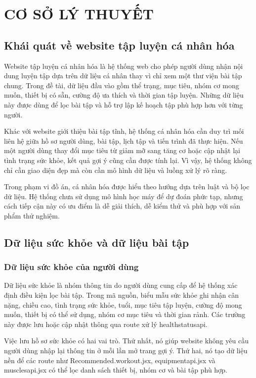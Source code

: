 \chapter{CƠ SỞ LÝ THUYẾT}

\section{Khái quát về website tập luyện cá nhân hóa}

Website tập luyện cá nhân hóa là hệ thống web cho phép người dùng nhận nội dung luyện tập dựa trên dữ liệu cá nhân thay vì chỉ xem một thư viện bài tập chung. Trong đề tài, dữ liệu đầu vào gồm thể trạng, mục tiêu, nhóm cơ mong muốn, thiết bị có sẵn, cường độ ưa thích và thời gian tập luyện. Những dữ liệu này được dùng để lọc bài tập và hỗ trợ lập kế hoạch tập phù hợp hơn với từng người.


Khác với website giới thiệu bài tập tĩnh, hệ thống cá nhân hóa cần duy trì mối liên hệ giữa hồ sơ người dùng, bài tập, lịch tập và tiến trình đã thực hiện. Nếu một người dùng thay đổi mục tiêu từ giảm mỡ sang tăng cơ hoặc cập nhật lại tình trạng sức khỏe, kết quả gợi ý cũng cần được tính lại. Vì vậy, hệ thống không chỉ cần giao diện đẹp mà còn cần mô hình dữ liệu và luồng xử lý rõ ràng.


Trong phạm vi đồ án, cá nhân hóa được hiểu theo hướng dựa trên luật và bộ lọc dữ liệu. Hệ thống chưa sử dụng mô hình học máy để dự đoán phức tạp, nhưng cách tiếp cận này có ưu điểm là dễ giải thích, dễ kiểm thử và phù hợp với sản phẩm thử nghiệm.


\section{Dữ liệu sức khỏe và dữ liệu bài tập}

\subsection{Dữ liệu sức khỏe của người dùng}

Dữ liệu sức khỏe là nhóm thông tin do người dùng cung cấp để hệ thống xác định điều kiện lọc bài tập. Trong mã nguồn, biểu mẫu sức khỏe ghi nhận cân nặng, chiều cao, tình trạng sức khỏe, tuổi, mục tiêu tập luyện, cường độ mong muốn, thiết bị có thể sử dụng, nhóm cơ mục tiêu và thời gian rảnh. Các trường này được lưu hoặc cập nhật thông qua route xử lý healthstatusapi.


Việc lưu hồ sơ sức khỏe có hai vai trò. Thứ nhất, nó giúp website không yêu cầu người dùng nhập lại thông tin ở mỗi lần mở trang gợi ý. Thứ hai, nó tạo dữ liệu nền để các route như Recommended.workout.jsx, equipmentapi.jsx và musclesapi.jsx có thể lọc danh sách thiết bị, nhóm cơ và bài tập phù hợp.


